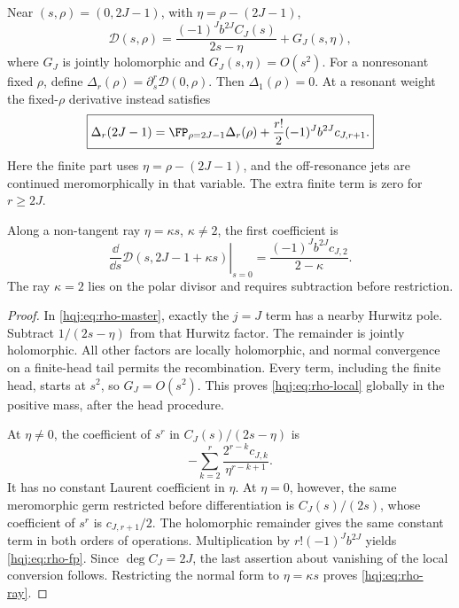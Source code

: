 \begin{theorem}
\label{hqj:thm:rho}
Near $(s,\rho)=(0,2J-1)$, with $\eta=\rho-(2J-1)$,
\begin{equation}\label{hqj:eq:rho-local}
\mathcal D(s,\rho)=
\frac{(-1)^Jb^{2J}C_J(s)}{2s-\eta}+G_J(s,\eta),
\end{equation}
where $G_J$ is jointly holomorphic and $G_J(s,\eta)=O(s^2)$.
For a nonresonant fixed $\rho$, define
$\Delta_r(\rho)=\partial_s^r\mathcal D(0,\rho)$.
Then $\Delta_1(\rho)=0$. At a resonant weight the fixed-$\rho$ derivative
instead satisfies
\begin{equation}\label{hqj:eq:rho-fp}
\boxed{\Delta_r(2J-1)
=\FP_{\rho=2J-1}\Delta_r(\rho)
+\frac{r!}{2}(-1)^Jb^{2J}c_{J,r+1}.}
\end{equation}
Here the finite part uses $\eta=\rho-(2J-1)$, and the off-resonance jets
are continued meromorphically in that variable. The extra finite term is
zero for $r\ge2J$.

Along a non-tangent ray $\eta=\kappa s$, $\kappa\ne2$, the first
coefficient is
\begin{equation}\label{hqj:eq:rho-ray}
\left.\frac{\dd}{\dd s}\mathcal D(s,2J-1+\kappa s)\right|_{s=0}
=\frac{(-1)^Jb^{2J}c_{J,2}}{2-\kappa}.
\end{equation}
The ray $\kappa=2$ lies on the polar divisor and requires subtraction
before restriction.
\end{theorem}
\begin{proof}
In \eqref{hqj:eq:rho-master}, exactly the $j=J$ term has a nearby
Hurwitz pole. Subtract $1/(2s-\eta)$ from that Hurwitz factor.
The remainder is jointly holomorphic. All other factors are locally
holomorphic, and normal convergence on a finite-head tail permits the
recombination. Every term, including the finite head, starts at $s^2$,
so $G_J=O(s^2)$. This proves \eqref{hqj:eq:rho-local} globally in the
positive mass, after the head procedure.

At $\eta\ne0$, the coefficient of $s^r$ in
$C_J(s)/(2s-\eta)$ is
\[
-\sum_{k=2}^r\frac{2^{r-k}c_{J,k}}{\eta^{r-k+1}}.
\]
It has no constant Laurent coefficient in $\eta$. At $\eta=0$, however,
the same meromorphic germ restricted before differentiation is
$C_J(s)/(2s)$, whose coefficient of $s^r$ is $c_{J,r+1}/2$.
The holomorphic remainder gives the same constant term in both orders
of operations. Multiplication by $r!(-1)^Jb^{2J}$ yields
\eqref{hqj:eq:rho-fp}. Since $\deg C_J=2J$, the last assertion about
vanishing of the local conversion follows. Restricting the normal form
to $\eta=\kappa s$ proves \eqref{hqj:eq:rho-ray}.
\end{proof}

